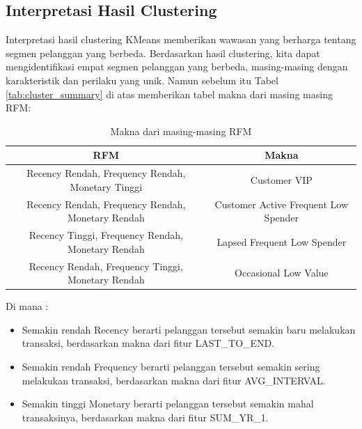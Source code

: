 \subsection{Interpretasi Hasil Clustering}
Interpretasi hasil clustering KMeans memberikan wawasan yang berharga tentang segmen pelanggan yang berbeda. Berdasarkan hasil clustering, kita dapat mengidentifikasi empat segmen pelanggan yang berbeda, masing-masing dengan karakteristik dan perilaku yang unik. Namun sebelum itu Tabel \ref{tab:cluster_summary} di atas memberikan tabel makna dari masing masing RFM:

\begin{table}[H]
    \centering
    \caption{Makna dari masing-masing RFM}
    \label{tab:rfm_meaning}
    \begin{tabular}{|c|c|}
        \hline
        RFM & Makna \\
        \hline
        Recency Rendah, Frequency Rendah, Monetary Tinggi & Customer VIP \\
        Recency Rendah, Frequency Rendah, Monetary Rendah & Customer Active Frequent Low Spender \\
        Recency Tinggi, Frequency Rendah, Monetary Rendah & Lapsed Frequent Low Spender \\
        Recency Rendah, Frequency Tinggi, Monetary Rendah & Occasional Low Value \\
        \hline
    \end{tabular}
\end{table}

Di mana :
\begin{itemize}
    \item Semakin rendah Recency berarti pelanggan tersebut semakin baru melakukan transaksi, berdasarkan makna dari fitur LAST\_TO\_END.
    \item Semakin rendah Frequency berarti pelanggan tersebut semakin sering melakukan transaksi, berdasarkan makna dari fitur AVG\_INTERVAL.
    \item Semakin tinggi Monetary berarti pelanggan tersebut semakin mahal transaksinya, berdasarkan makna dari fitur SUM\_YR\_1.
\end{itemize}

